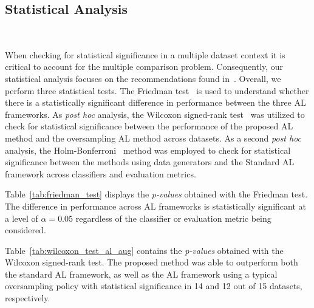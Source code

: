 \subsection{Statistical Analysis}~\label{sec:statistical-analysis-al-aug}

When checking for statistical significance in a multiple dataset context it is
critical to account for the multiple comparison problem. Consequently, our
statistical analysis focuses on the recommendations found
in~\cite{Demsar2006}. Overall, we perform three statistical tests. The
Friedman test~\cite{Friedman1937} is used to understand whether there is a
statistically significant difference in performance between the three AL
frameworks. As \textit{post hoc} analysis, the Wilcoxon signed-rank
test~\cite{Wilcoxon1945} was utilized to check for statistical significance
between the performance of the proposed AL method and the oversampling AL
method across datasets. As a second \textit{post hoc} analysis, the
Holm-Bonferroni~\cite{Holm1979} method was employed to check for statistical
significance between the methods using data generators and the Standard AL
framework across classifiers and evaluation metrics.
 
Table~\ref{tab:friedman_test} displays the \textit{p-values} obtained with the
Friedman test. The difference in performance across AL frameworks is
statistically significant at a level of $\alpha = 0.05$ regardless of the
classifier or evaluation metric being considered.

\begin{table}[t]
	\centering
    \caption[Friedman test results.]{%
        Friedman test results. Statistical significance is tested at a level
        of $\alpha = 0.05$. The null hypothesis is that there is no difference
        in the classification outcome across oversamplers.
    }\label{tab:friedman_test}
\end{table}

Table~\ref{tab:wilcoxon_test_al_aug} contains the \textit{p-values} obtained with the
Wilcoxon signed-rank test. The proposed method was able to outperform both the
standard AL framework, as well as the AL framework using a typical
oversampling policy with statistical significance in 14 and 12 out of 15
datasets, respectively.

